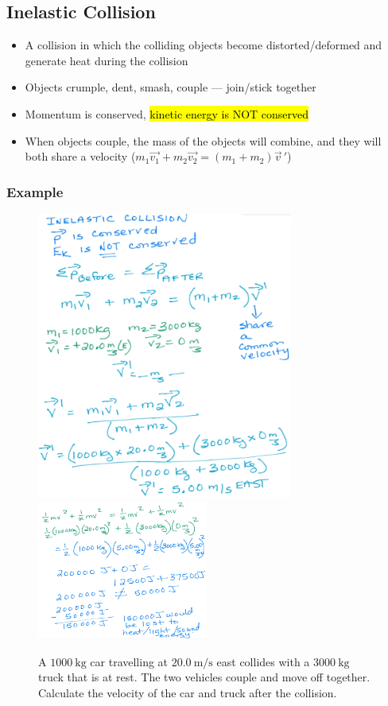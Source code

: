 \documentclass[a4paper,12pt]{article}
\begin{document}
\subsection{Inelastic Collision}
\begin{itemize}
    \item{A collision in which the colliding objects become distorted/deformed and generate heat during the collision}
    \item{Objects crumple, dent, smash, couple --- join/stick together}
    \item{Momentum is conserved, \hl{kinetic energy is NOT conserved}}
    \item{When objects couple, the mass of the objects will combine, and they will both share a velocity ($m_1\vec{v_1} + m_2\vec{v_2} = (m_1+m_2)\vec{v}\,'$)}
\end{itemize}

\subsubsection{Example}
\begin{figure}[H]
    \centering
    \caption{A $\SI{1000}{\kg}$ car travelling at $\SI{20.0}{\m/\s}$ east collides with a $\SI{3000}{\kg}$ truck that is at rest. The two vehicles couple and move off together. Calculate the velocity of the car and truck after the collision.}
    \includegraphics[width=0.75\textwidth]{q-inelastic-1}
    \includegraphics[width=0.5\textwidth]{q-inelastic-1b}
\end{figure}
\end{document}
